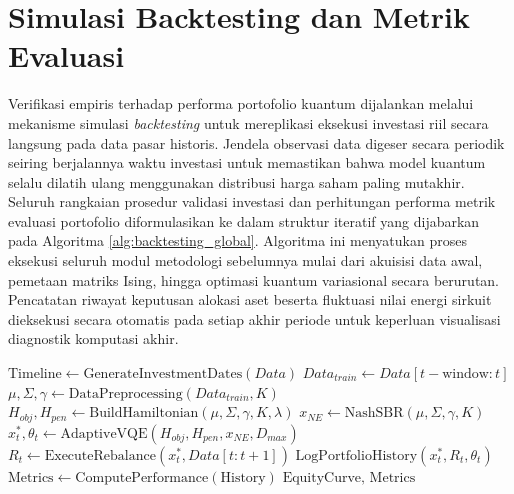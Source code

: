 \section{Simulasi Backtesting dan Metrik Evaluasi}
Verifikasi empiris terhadap performa portofolio kuantum dijalankan melalui mekanisme simulasi \textit{backtesting} untuk mereplikasi eksekusi investasi riil secara langsung pada data pasar historis. Jendela observasi data digeser secara periodik seiring berjalannya waktu investasi untuk memastikan bahwa model kuantum selalu dilatih ulang menggunakan distribusi harga saham paling mutakhir. Seluruh rangkaian prosedur validasi investasi dan perhitungan performa metrik evaluasi portofolio diformulasikan ke dalam struktur iteratif yang dijabarkan pada Algoritma \ref{alg:backtesting_global}. Algoritma ini menyatukan proses eksekusi seluruh modul metodologi sebelumnya mulai dari akuisisi data awal, pemetaan matriks Ising, hingga optimasi kuantum variasional secara berurutan. Pencatatan riwayat keputusan alokasi aset beserta fluktuasi nilai energi sirkuit dieksekusi secara otomatis pada setiap akhir periode untuk keperluan visualisasi diagnostik komputasi akhir.

\begin{algorithm}[ht]
\caption{Prosedur Backtesting Global Portofolio GT-VQE}
\label{alg:backtesting_global}
\begin{algorithmic}[1]
    \State $\text{Timeline} \gets \text{GenerateInvestmentDates}(Data)$
        \State $Data_{train} \gets Data[t-\text{window} : t]$
        \State $\mu, \Sigma, \gamma \gets \text{DataPreprocessing}(Data_{train}, K)$ 
        \State $H_{obj}, H_{pen} \gets \text{BuildHamiltonian}(\mu, \Sigma, \gamma, K, \lambda)$ 
        \State $x_{NE} \gets \text{NashSBR}(\mu, \Sigma, \gamma, K)$ 
        \State $x^*_t, \theta_t \gets \text{AdaptiveVQE}(H_{obj}, H_{pen}, x_{NE}, D_{max})$ 
        \State $R_t \gets \text{ExecuteRebalance}(x^*_t, Data[t : t+1])$ 
        \State $\text{LogPortfolioHistory}(x^*_t, R_t, \theta_t)$
    \EndFor
    \State $\text{Metrics} \gets \text{ComputePerformance}(\text{History})$ 
    \State \Return $\text{EquityCurve, Metrics}$
\EndProcedure
\end{algorithmic}
\end{algorithm}

